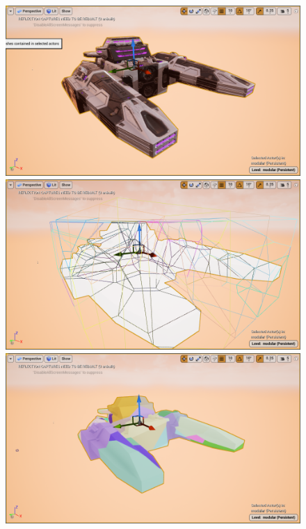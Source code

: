 \documentclass[sigconf]{acmart}
\begin{document}
\begin{figure}
\begin{multicols}{2}
    \includegraphics[width=\linewidth]{aaafiles/0.png}\par 
    \includegraphics[width=\linewidth]{aaafiles/1.png}\par 
    \end{multicols}
\begin{multicols}{2}
    \includegraphics[width=\linewidth]{aaafiles/2.png}\par

\end{multicols}
\end{figure}
\end{document}
